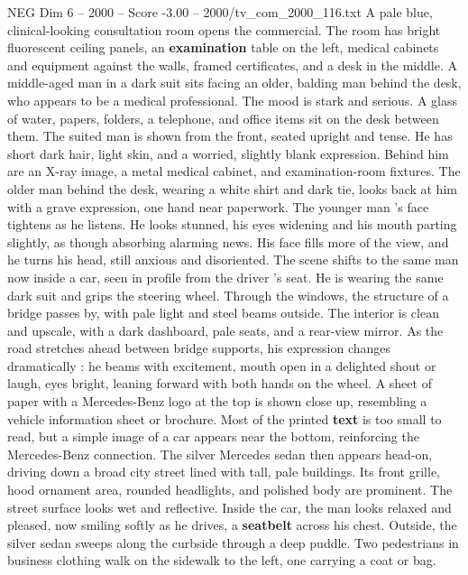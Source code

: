 \begin{textsample}{NEG Dim 6 – 2000 – Score -3.00 – 2000/tv\_com\_2000\_116.txt}  \label{ex:f6_neg_043}
A pale blue, clinical-looking consultation room opens the commercial.
The room has bright fluorescent ceiling panels, an \textbf{examination} table on the left, medical cabinets and equipment against the walls, framed certificates, and a desk in the middle.
A middle-aged man in a dark suit sits facing an older, balding man behind the desk, who appears to be a medical professional.
The mood is stark and serious.
A glass of water, papers, folders, a telephone, and office items sit on the desk between them.
The suited man is shown from the front, seated upright and tense.
He has short dark hair, light skin, and a worried, slightly blank expression.
Behind him are an X-ray image, a metal medical cabinet, and examination-room fixtures.
The older man behind the desk, wearing a white shirt and dark tie, looks back at him with a grave expression, one hand near paperwork.
The younger man ’s face tightens as he listens.
He looks stunned, his eyes widening and his mouth parting slightly, as though absorbing alarming news.
His face fills more of the view, and he turns his head, still anxious and disoriented.
The scene shifts to the same man now inside a car, seen in profile from the driver ’s seat.
He is wearing the same dark suit and grips the steering wheel.
Through the windows, the structure of a bridge passes by, with pale light and steel beams outside.
The interior is clean and upscale, with a dark dashboard, pale seats, and a rear-view mirror.
As the road stretches ahead between bridge supports, his expression changes dramatically : he beams with excitement, mouth open in a delighted shout or laugh, eyes bright, leaning forward with both hands on the wheel.
A sheet of paper with a Mercedes-Benz logo at the top is shown close up, resembling a vehicle information sheet or brochure.
Most of the printed \textbf{text} is too small to read, but a simple image of a car appears near the bottom, reinforcing the Mercedes-Benz connection.
The silver Mercedes sedan then appears head-on, driving down a broad city street lined with tall, pale buildings.
Its front grille, hood ornament area, rounded headlights, and polished body are prominent.
The street surface looks wet and reflective.
Inside the car, the man looks relaxed and pleased, now smiling softly as he drives, a \textbf{seatbelt} across his chest.
Outside, the silver sedan sweeps along the curbside through a deep puddle.
Two pedestrians in business clothing walk on the sidewalk to the left, one carrying a coat or bag.

\end{textsample}
